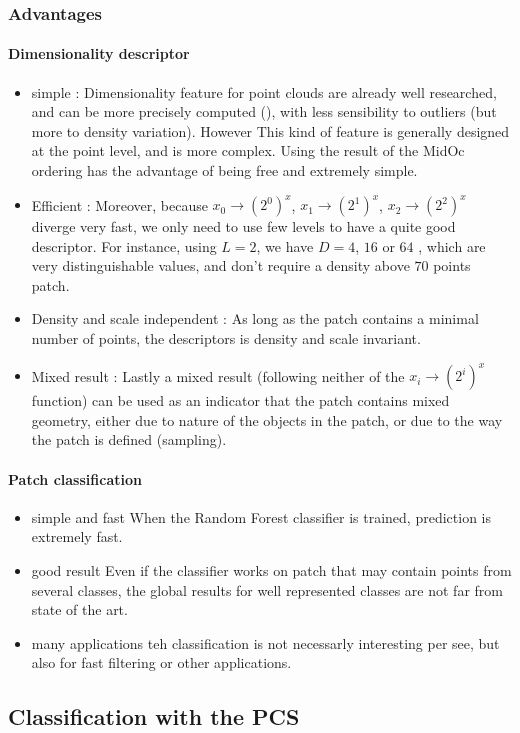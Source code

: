 			 	
		\subsubsection{Advantages}
			\paragraph{Dimensionality descriptor}
			\begin{itemize}			
				\item simple : 
					Dimensionality feature for point clouds are already well researched, and can be more precisely computed (\cite{Demantke2014}), with less sensibility to outliers (but more to density variation). However This kind of feature is generally designed at the point level, and is more complex.
					Using the result of the MidOc ordering has the advantage of being free and extremely simple. 
				\item Efficient :
					Moreover, because $x_0 \rightarrow (2^0)^x$,
					 $x_1 \rightarrow (2^1)^x$, $x_2 \rightarrow (2^2)^x$ diverge very fast, we only need to use few levels to have a quite good descriptor. For instance, using $L=2$, we have $D=4$, $16$ or $64$ , which are very distinguishable values, and don't require a density above $70$ points \per patch. 
				\item Density and scale independent :
					As long as the patch contains a minimal number of points, the descriptors is density and scale invariant.
				\item Mixed result : 
					Lastly a mixed result (following neither of the $x_i \rightarrow (2^i)^x$ function) can be used as an indicator that the patch contains mixed geometry, either due to nature of the objects in the patch, or due to the way the patch is defined (sampling).
			\end{itemize}	
			
			\paragraph{Patch classification}
			\begin{itemize}
				\item simple and fast
					When the Random Forest classifier is trained, prediction is extremely fast.
				\item good result
					Even if the classifier works on patch that may contain points from several classes, the global results for well represented classes are not far from state of the art.
				\item many applications
					teh classification is not necessarly interesting per see, but also for fast filtering or other applications.
			\end{itemize}
			
		
	\subsection{Classification with the PCS}
		\label{method.classif}
		
